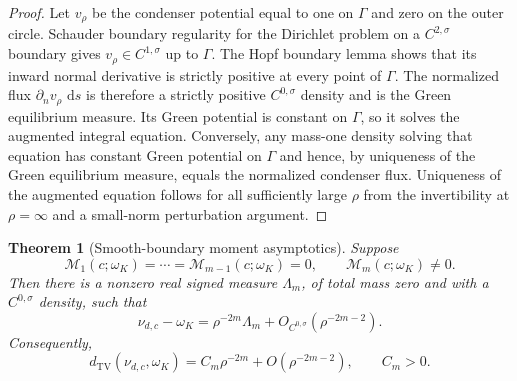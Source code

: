 \documentclass[11pt]{article}
\theoremstyle{mainthm}
\newtheorem{theorem}{Theorem}[section]
\theoremstyle{definition}
\theoremstyle{remark}
\newcommand{\dd}{\,\mathrm d}
\newcommand{\dTV}{d_{\mathrm{TV}}}
\begin{document}
\begin{proof}
Let $v_\rho$ be the condenser potential equal to one on $\Gamma$ and zero on the outer circle. Schauder boundary regularity for the Dirichlet problem on a $C^{2,\sigma}$ boundary gives $v_\rho\in C^{1,\sigma}$ up to $\Gamma$. The Hopf boundary lemma shows that its inward normal derivative is strictly positive at every point of $\Gamma$. The normalized flux $\partial_n v_\rho\,\dd s$ is therefore a strictly positive $C^{0,\sigma}$ density and is the Green equilibrium measure. Its Green potential is constant on $\Gamma$, so it solves the augmented integral equation. Conversely, any mass-one density solving that equation has constant Green potential on $\Gamma$ and hence, by uniqueness of the Green equilibrium measure, equals the normalized condenser flux. Uniqueness of the augmented equation follows for all sufficiently large $\rho$ from the invertibility at $\rho=\infty$ and a small-norm perturbation argument.
\end{proof}

\begin{theorem}[Smooth-boundary moment asymptotics]
\label{thm:smooth-asymptotic}
Suppose
\[
  \mathcal M_1(c;\omega_K)=\cdots=
  \mathcal M_{m-1}(c;\omega_K)=0,
  \qquad
  \mathcal M_m(c;\omega_K)\ne0.
\]
Then there is a nonzero real signed measure $\Lambda_m$, of total mass zero and with a $C^{0,\sigma}$ density, such that
\[
  \nu_{d,c}-\omega_K
  =\rho^{-2m}\Lambda_m
  +O_{C^{0,\sigma}}(\rho^{-2m-2}).
\]
Consequently,
\[
  \dTV(\nu_{d,c},\omega_K)
  =C_m\rho^{-2m}+O(\rho^{-2m-2}),
  \qquad C_m>0.
\]
\end{theorem}
\end{document}
